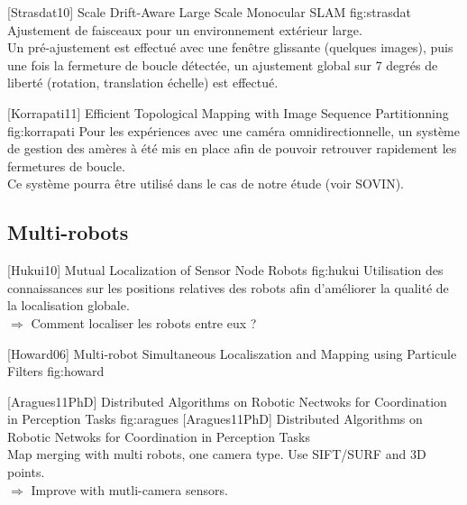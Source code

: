         
        
        {[Strasdat10] Scale Drift-Aware Large Scale Monocular SLAM}
      {fig:strasdat}   
        Ajustement de faisceaux pour un environnement extérieur large.\\
        Un pré-ajustement est effectué avec une fenêtre glissante (quelques images), puis une fois la fermeture de boucle détectée, un ajustement global sur 7 degrés de liberté (rotation, translation échelle) est effectué. 



        {[Korrapati11] Efficient Topological Mapping with Image Sequence Partitionning}
      {fig:korrapati}  
        Pour les expériences avec une caméra omnidirectionnelle, un système de gestion des amères à été mis en place afin de pouvoir retrouver rapidement les fermetures de boucle.\\
        Ce système pourra être utilisé dans le cas de notre étude (voir SOVIN).



\subsection{Multi-robots}

      {[Hukui10] Mutual Localization of Sensor Node Robots}
      {fig:hukui}  
        Utilisation des connaissances sur les positions relatives des robots afin d'améliorer la qualité de la localisation globale.\\
        $\Rightarrow$ Comment localiser les robots entre eux ?


       {[Howard06] Multi-robot Simultaneous Localiszation and Mapping using Particule Filters}
      {fig:howard}  
      
      
      
      {[Aragues11PhD] Distributed Algorithms on Robotic Nectwoks for Coordination in Perception Tasks}
      {fig:aragues}  
        [Aragues11PhD] Distributed Algorithms on Robotic Netwoks for Coordination in Perception Tasks\\
        Map merging with multi robots, one camera type. Use SIFT/SURF and 3D points.\\
        $\Rightarrow$ Improve with mutli-camera sensors. 
        
        
        
